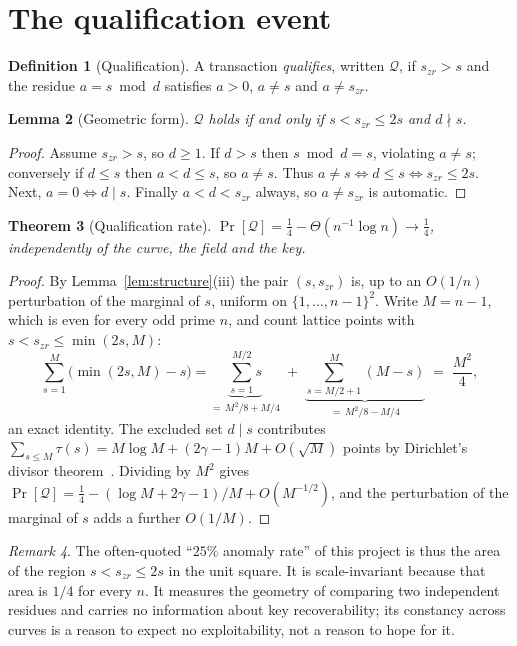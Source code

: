 \documentclass[11pt,a4paper]{article}
\theoremstyle{plain}
\newtheorem{theorem}{Theorem}
\newtheorem{lemma}[theorem]{Lemma}
\theoremstyle{definition}
\newtheorem{definition}[theorem]{Definition}
\theoremstyle{remark}
\newtheorem{remark}[theorem]{Remark}
\newcommand{\Qu}{\mathcal{Q}}
\newcommand{\Pro}{\Pr}
\newcommand{\szr}{s_{zr}}
\begin{document}
\section{The qualification event}\label{sec:qual}

\begin{definition}[Qualification]\label{def:qual}
A transaction \emph{qualifies}, written $\Qu$, if $\szr > s$ and the residue $a = s \bmod d$
satisfies $a > 0$, $a \neq s$ and $a \neq \szr$.
\end{definition}

\begin{lemma}[Geometric form]\label{lem:qualgeom}
$\Qu$ holds if and only if $s < \szr \le 2s$ and $d \nmid s$.
\end{lemma}

\begin{proof}
Assume $\szr > s$, so $d \ge 1$. If $d > s$ then $s\bmod d = s$, violating $a \neq s$; conversely
if $d \le s$ then $a < d \le s$, so $a \neq s$. Thus $a \neq s \iff d \le s \iff \szr \le 2s$.
Next, $a = 0 \iff d \mid s$. Finally $a < d < \szr$ always, so $a \neq \szr$ is automatic.
\end{proof}

\begin{theorem}[Qualification rate]\label{thm:qual}
$\Pro[\Qu] = \tfrac14 - \Theta\!\left(n^{-1}\log n\right) \to \tfrac14$, independently of the
curve, the field and the key.
\end{theorem}

\begin{proof}
By Lemma~\ref{lem:structure}(iii) the pair $(s,\szr)$ is, up to an $O(1/n)$ perturbation of the
marginal of $s$, uniform on $\{1,\dots,n-1\}^{2}$. Write $M = n-1$, which is even for every odd
prime $n$, and count lattice points with $s < \szr \le \min(2s,M)$:
\[
  \sum_{s=1}^{M}\bigl(\min(2s,M) - s\bigr)
  = \underbrace{\sum_{s=1}^{M/2} s}_{=\,M^{2}/8 + M/4}
  \;+\; \underbrace{\sum_{s=M/2+1}^{M}(M-s)}_{=\,M^{2}/8 - M/4}
  \;=\; \frac{M^{2}}{4},
\]
an exact identity. The excluded set $d \mid s$ contributes
$\sum_{s \le M}\tau(s) = M\log M + (2\gamma-1)M + O(\sqrt{M})$ points by Dirichlet's divisor
theorem~\cite[Thm.~320]{hardywright}. Dividing by $M^{2}$ gives
$\Pro[\Qu] = \tfrac14 - (\log M + 2\gamma - 1)/M + O(M^{-1/2})$, and the perturbation of the
marginal of $s$ adds a further $O(1/M)$.
\end{proof}

\begin{remark}
The often-quoted ``$25\%$ anomaly rate'' of this project is thus the area of the region
$s < \szr \le 2s$ in the unit square. It is scale-invariant because that area is $1/4$ for every
$n$. It measures the geometry of comparing two independent residues and carries no information
about key recoverability; its constancy across curves is a reason to expect no exploitability, not
a reason to hope for it.
\end{remark}
\end{document}
